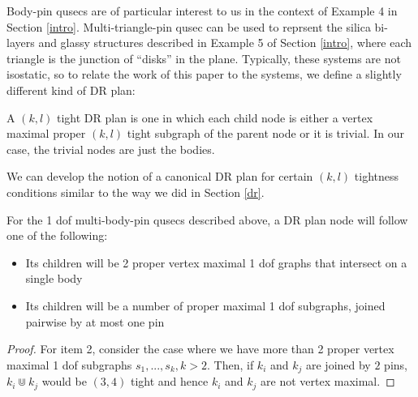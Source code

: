 Body-pin qusecs are of particular interest to us in the context of Example 4 in Section \ref{intro}. Multi-triangle-pin qusec can be used to reprsent the silica bi-layers and glassy structures described in Example 5 of Section \ref{intro}, where each triangle is the junction of ``disks'' in the plane. Typically, these systems are not isostatic, so to relate the work of this paper to the systems, we define a slightly different kind of DR plan:

\begin{definition}
    A $(k,l)$ tight DR plan is one in which each child node is either a vertex maximal proper $(k,l)$ tight subgraph of the parent node or it is trivial. In our case, the trivial nodes are just the bodies.
\end{definition}

We can develop the notion of a canonical DR plan for certain $(k,l)$ tightness conditions similar to the way we did in Section \ref{dr}.

\begin{remark}
\label{rem:1dofcanon}
    For the 1 dof multi-body-pin qusecs described above, a DR plan node will follow one of the following:

    \begin{itemize}
        \item Its children will be 2 proper vertex maximal 1 dof graphs that intersect on a single body
        \item Its children will be a number of proper maximal 1 dof subgraphs, joined pairwise by at most one pin
    \end{itemize}
\end{remark}

\begin{proof}

    For item 2, consider the case where we have more than 2 proper vertex maximal 1 dof subgraphs $s_1, ..., s_k, k > 2$. Then, if $k_i$ and $k_j$ are joined by $2$ pins, $k_i \Cup k_j$ would be $(3,4)$ tight and hence $k_i$ and $k_j$ are not vertex maximal.
\end{proof}

